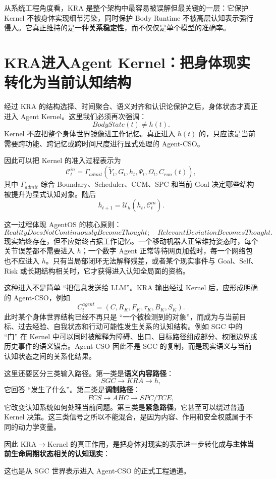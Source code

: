 从系统工程角度看，KRA 是整个架构中最容易被误解但最关键的一层：它保护 Kernel 不被身体实现细节污染，同时保护 Body Runtime 不被高层认知表示强行侵入。它真正维持的是一种\textbf{关系稳定性}，而不仅仅是单个模型的准确率。


\section{KRA进入Agent Kernel：把身体现实转化为当前认知结构}

经过 KRA 的结构选择、时间聚合、语义对齐和认识论保护之后，身体状态才真正进入 Agent Kernel。这里我们必须再次强调：
\[
\boxed{
BodyState(t)\neq h(t).
}
\]
Kernel 不应把整个身体世界镜像进工作记忆。真正进入 $h(t)$ 的，只应该是当前需要跨功能、跨记忆或跨时间尺度进行显式处理的 Agent-CSO。

因此可以把 Kernel 的准入过程表示为
\[
\mathcal C_t^{in}
=
\Gamma_{admit}
\left(
\tilde Y_t,
G_t,
h_t,
\Psi_t,
\Omega_t,
C_{run}(t)
\right),
\]
其中 $\Gamma_{admit}$ 综合 Boundary、Scheduler、CCM、SPC 和当前 Goal 决定哪些结构被提升为显式认知对象。随后
\[
h_{t+1}
=
\mathcal U_h
\left(
h_t,
\mathcal C_t^{in}
\right).
\]

这一过程体现 AgentOS 的核心原则：
\[
\boxed{
RealityDoesNotContinuouslyBecomeThought;
\quad
RelevantDeviationBecomesThought .
}
\]
现实始终存在，但不应始终占据工作记忆。一个移动机器人正常维持姿态时，每个关节误差都不需要进入 $h$；一个数字 Agent 正常等待网页加载时，每一个网络包也不应进入 $h$。只有当局部闭环无法解释残差，或者某个现实事件与 Goal、Self、Risk 或长期结构相关时，它才获得进入认知全局面的资格。

这种进入不是简单 ``把信息发送给 LLM''。KRA 输出经过 Kernel 后，应形成明确的 Agent-CSO，例如
\[
C_t^{agent}
=
\left(
C,
R_K,
F_K,
\tau_K,
B_K,
S_K
\right).
\]
此时某个身体世界结构已经不再只是 ``一个被检测到的对象''，而成为与当前目标、过去经验、自我状态和行动可能性发生关系的认知结构。例如 SGC 中的 ``门'' 在 Kernel 中可以同时被解释为障碍、出口、目标路径组成部分、权限边界或历史事件的语义锚点。Agent-CSO 因此不是 SGC 的复制，而是现实语义与当前认知状态之间的关系化结果。

这里还要区分三类输入路径。第一类是\textbf{语义内容路径}：
\[
SGC
\rightarrow
KRA
\rightarrow
h ,
\]
它回答 ``发生了什么''。第二类是\textbf{调制路径}：
\[
FCS
\rightarrow
AHC
\rightarrow
SPC/TCE ,
\]
它改变认知系统如何处理当前问题。第三类是\textbf{紧急路径}，它甚至可以绕过普通 Kernel 决策。这三类信号之所以不能混合，是因为内容、作用和安全权威属于不同的动力学变量。

因此 KRA$\rightarrow$Kernel 的真正作用，是把身体对现实的表示进一步转化成\textbf{与主体当前生命周期状态相关的认知现实}：
\begin{statementbox}
\centering
{}
\end{statementbox}
这也是从 SGC 世界表示进入 Agent-CSO 的正式工程通道。


